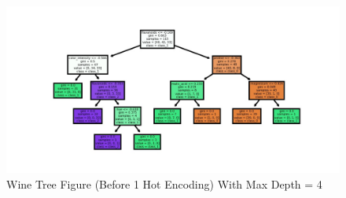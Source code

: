 \documentclass{article}
\begin{document}
\begin{figure}[H]

\includegraphics[width=7.5in]{wine tree.jpg}
\caption{Wine Tree Figure (Before 1 Hot Encoding) With Max Depth = 4 }
\end{figure} 
\end{document}
